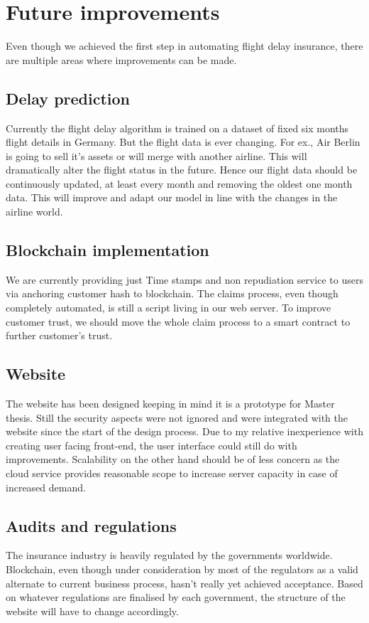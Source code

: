\section{Future improvements}
Even though we achieved the first step in automating flight delay insurance, there are multiple areas where improvements can be made. 
\subsection{Delay prediction}
Currently the flight delay algorithm is trained on a dataset of fixed six months flight details in Germany. But the flight data is ever changing. For ex., Air Berlin is going to sell it's assets or will merge with another airline. This will dramatically alter the flight status in the future. Hence our flight data should be continuously updated, at least every month and removing the oldest one month data. This will improve and adapt our model in line with the changes in the airline world.

\subsection{Blockchain implementation}
We are currently providing just Time stamps and non repudiation service to users via anchoring customer hash to blockchain. The claims process, even though completely automated, is still a script living in our web server. To improve customer trust, we should move the whole claim process to a smart contract to further customer's trust. 

\subsection{Website}
The website has been designed keeping in mind it is a prototype for Master thesis. Still the security aspects were not ignored and were integrated with the website since the start of the design process. Due to my relative inexperience with creating user facing front-end, the user interface could still do with improvements. Scalability on the other hand should be of less concern as the cloud service provides reasonable scope to increase server capacity in case of increased demand.

\subsection{Audits and regulations}
The insurance industry is heavily regulated by the governments worldwide. Blockchain, even though under consideration by most of the regulators as a valid alternate to current business process, hasn't really yet achieved acceptance. Based on whatever regulations are finalised by each government, the structure of the website will have to change accordingly.



